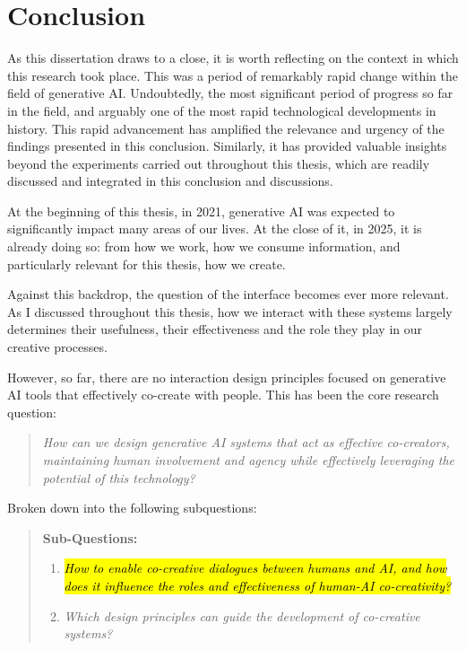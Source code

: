 \chapter[Conclusion]{Conclusion}\label{c:conclusion}

As this dissertation draws to a close, it is worth reflecting on the context in which this research took place. This was a period of remarkably rapid change within the field of generative AI. Undoubtedly, the most significant period of progress so far in the field, and arguably one of the most rapid technological developments in history. This rapid advancement has amplified the relevance and urgency of the findings presented in this conclusion. Similarly, it has provided valuable insights beyond the experiments carried out throughout this thesis, which are readily discussed and integrated in this conclusion and discussions. 

At the beginning of this thesis, in 2021, generative AI was expected to significantly impact many areas of our lives. At the close of it, in 2025, it is already doing so: from how we work, how we consume information, and particularly relevant for this thesis, how we create.

Against this backdrop, the question of the interface becomes ever more relevant. As I discussed throughout this thesis, how we interact with these systems largely determines their usefulness, their effectiveness and the role they play in our creative processes. 

However, so far, there are no interaction design principles focused on generative AI tools that effectively co-create with people. This has been the core research question: 

\begin{quote}
\emph{How can we design generative AI systems that act as effective co-creators, maintaining human involvement and agency while effectively leveraging the potential of this technology?}
\end{quote}

Broken down into the following subquestions: 

\begin{quote}
\textbf{Sub-Questions:}
\begin{enumerate}
    \item \emph{\hl{How to enable co-creative dialogues between humans and AI, and how does it influence the roles and effectiveness of human-AI co-creativity?}}
    \item \emph{Which design principles can guide the development of co-creative systems?}
\end{enumerate}
\end{quote}

